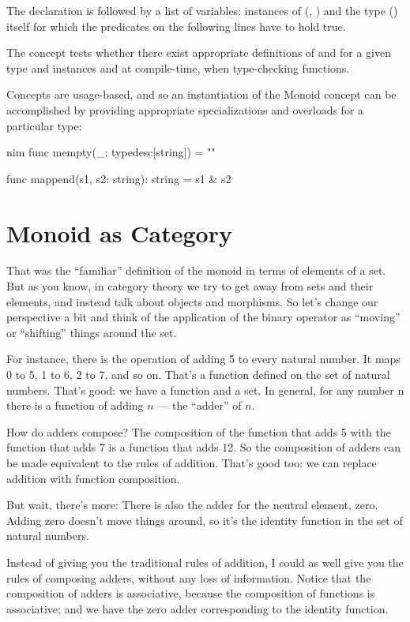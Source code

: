 The  declaration is followed by a list of variables: instances of
 (, ) and the type  ()
itself for which the predicates on the following lines have to hold true.

The concept  tests whether there exist appropriate definitions of
 and  for a given type  and instances
 and  at compile-time, when type-checking functions.

Concepts are usage-based, and so an instantiation of the Monoid concept can be
accomplished by providing appropriate specializations and overloads for a
particular type:

\begin{snip}{nim}
func mempty(_: typedesc[string]) = ""

func mappend(s1, s2: string): string = s1 & s2
\end{snip}

\section{Monoid as Category}

That was the ``familiar'' definition of the monoid in terms of elements
of a set. But as you know, in category theory we try to get away from
sets and their elements, and instead talk about objects and morphisms.
So let's change our perspective a bit and think of the application of
the binary operator as ``moving'' or ``shifting'' things around the set.

For instance, there is the operation of adding 5 to every natural
number. It maps 0 to 5, 1 to 6, 2 to 7, and so on. That's a function
defined on the set of natural numbers. That's good: we have a function
and a set. In general, for any number n there is a function of adding $n$
--- the ``adder'' of $n$.

How do adders compose? The composition of the function that adds 5 with
the function that adds 7 is a function that adds 12. So the composition
of adders can be made equivalent to the rules of addition. That's good
too: we can replace addition with function composition.

But wait, there's more: There is also the adder for the neutral element,
zero. Adding zero doesn't move things around, so it's the identity
function in the set of natural numbers.

Instead of giving you the traditional rules of addition, I could as well
give you the rules of composing adders, without any loss of information.
Notice that the composition of adders is associative, because the
composition of functions is associative; and we have the zero adder
corresponding to the identity function.

